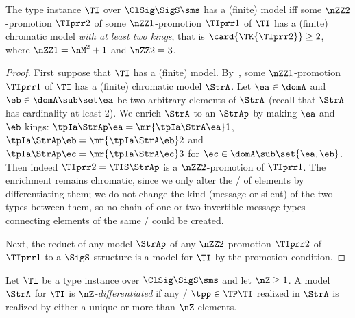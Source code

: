 \begin{remark}\label{rem:prop-twokings}
The type instance $\TI$ over $\ClSig\SigS\sms$ has a (finite) model
iff some $\nZZ2$-promotion $\TIprr2$
of some $\nZZ1$-promotion $\TIprr1$ 
of $\TI$ has a (finite) chromatic model \emph{with at least two kings}, that is
$\card{\TK{\TIprr2}}\geq2$,
where $\nZZ1 = \nM^2+1$ and $\nZZ2 = 3$.
\end{remark}
\begin{proof}
First suppose that $\TI$ has a (finite) model.
By~,
some $\nZZ1$-promotion $\TIprr1$
of $\TI$ has a (finite) chromatic model $\StrA$.
Let $\ea\in\domA$ and $\eb\in\domA\sub\set\ea$ be two arbitrary elements of
$\StrA$ (recall that $\StrA$ has cardinality at least $2$).
We enrich $\StrA$ to an $\StrAp$ by making $\ea$ and $\eb$ kings:
$\tpIa\StrAp\ea = \mr{\tpIa\StrA\ea}1$,
$\tpIa\StrAp\eb = \mr{\tpIa\StrA\eb}2$
and $\tpIa\StrAp\ec = \mr{\tpIa\StrA\ec}3$ for $\ec\in\domA\sub\set{\ea,\eb}$.
Then indeed $\TIprr2 = \TIS\StrAp$ is a $\nZZ2$-promotion of $\TIprr1$.
The enrichment remains chromatic, since we only alter the \onetypes/ of elements
by differentiating them; we do not change the kind (message or silent) of the
two-types between them, so no chain of one or two invertible message types
connecting elements of the same \onetype/ could be created.

Next, the reduct of any model $\StrAp$ of any $\nZZ2$-promotion $\TIprr2$ of
$\TIprr1$ to a $\SigS$-structure is a model for $\TI$ by the promotion
condition.
\end{proof}

\begin{definition}
Let $\TI$ be a type instance over $\ClSig\SigS\sms$ and let $\nZ\geq1$.
A model $\StrA$ for $\TI$ is \emph{$\nZ$-differentiated} if any \onetype/
$\tpp\in\TP\TI$ realized in $\StrA$ is realized by either a unique or more than
$\nZ$ elements.
\end{definition}

